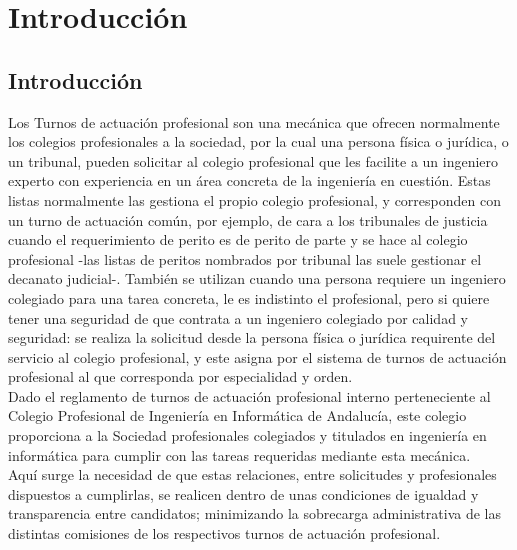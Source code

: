 \documentclass[12pt,a4paper,oneside,spanish]{book}
\newcounter{ri}
\begin{document}


\tableofcontents


\chapter{Introducción}

\section{Introducción}



Los Turnos de actuación profesional son una mecánica que ofrecen normalmente los colegios profesionales a la sociedad, por la cual una persona física o jurídica, o un tribunal, pueden solicitar al colegio profesional que les facilite a un ingeniero experto con experiencia en un área concreta de la ingeniería en cuestión. Estas listas normalmente las gestiona el propio colegio profesional, y corresponden con un turno de actuación común, por ejemplo, de cara a los tribunales de justicia cuando el requerimiento de perito es de perito de parte y se hace al colegio profesional -las listas de peritos nombrados por tribunal las suele gestionar el decanato judicial-. También se utilizan cuando una persona requiere un ingeniero colegiado para una tarea concreta, le es indistinto el profesional, pero si quiere tener una seguridad de que contrata a un ingeniero colegiado por calidad y seguridad: se realiza la solicitud desde la persona física o jurídica requirente del servicio al colegio profesional, y este asigna por el sistema de turnos de actuación profesional al que corresponda por especialidad y orden. \\

Dado el reglamento de turnos de actuación profesional interno perteneciente al Colegio Profesional de Ingeniería en Informática de Andalucía, este colegio proporciona a la Sociedad profesionales colegiados y titulados en ingeniería en informática para cumplir con las tareas requeridas mediante esta mecánica. \\

Aquí surge la necesidad de que estas relaciones, entre solicitudes y profesionales dispuestos a cumplirlas, se realicen dentro de unas condiciones de igualdad y transparencia entre candidatos; minimizando la sobrecarga administrativa de las distintas comisiones de los respectivos turnos de actuación profesional.
\end{document}
